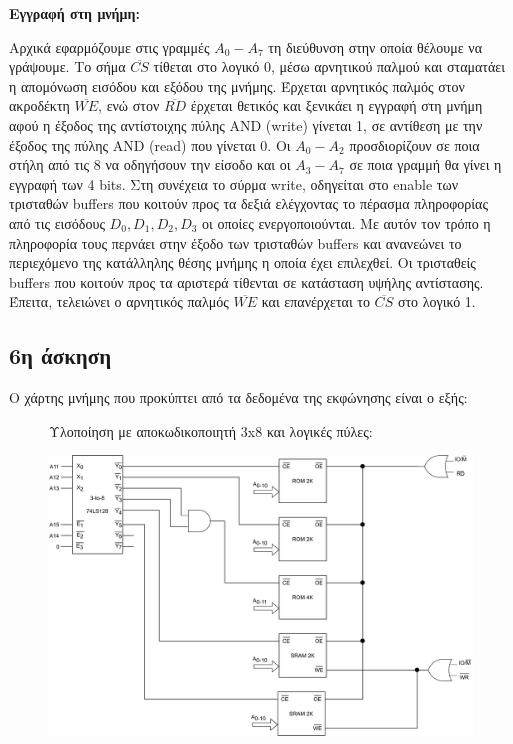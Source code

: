 \documentclass[a4paper]{article}
\begin{document}
\textbf{Εγγραφή στη μνήμη:}

Αρχικά εφαρμόζουμε στις γραμμές $Α_0-Α_7$ τη διεύθυνση στην οποία θέλουμε να γράψουμε. Το σήμα $\overline{CS}$ τίθεται στο λογικό 0, μέσω αρνητικού παλμού και σταματάει η απομόνωση εισόδου και εξόδου της μνήμης. Έρχεται αρνητικός παλμός στον ακροδέκτη $\overline{WE}$, ενώ στον $\overline{RD}$ έρχεται θετικός και ξενικάει η εγγραφή στη μνήμη αφού η έξοδος της αντίστοιχης πύλης AND (write) γίνεται 1, σε αντίθεση με την έξοδος της πύλης AND (read) που γίνεται 0. Οι $Α_0-A_2$ προσδιορίζουν σε ποια στήλη από τις 8 να οδηγήσουν την είσοδο και οι $Α_3-Α_7$ σε ποια γραμμή θα γίνει η εγγραφή των 4 bits. Στη συνέχεια το σύρμα write, οδηγείται στο enable των τρισταθών buffers που κοιτούν προς τα δεξιά ελέγχοντας το πέρασμα πληροφορίας από τις εισόδους $D_0, D_1, D_2, D_3$ οι οποίες ενεργοποιούνται. Με αυτόν τον τρόπο η πληροφορία τους περνάει στην έξοδο των τρισταθών buffers και ανανεώνει το περιεχόμενο της κατάλληλης θέσης μνήμης η οποία έχει επιλεχθεί. Οι τρισταθείς buffers που κοιτούν προς τα αριστερά τίθενται σε κατάσταση υψήλης αντίστασης. Έπειτα, τελειώνει ο αρνητικός παλμός $\overline{WE}$ και επανέρχεται το $\overline{CS}$ στο λογικό 1.


\subsection*{6η άσκηση}

Ο χάρτης μνήμης που προκύπτει από τα δεδομένα της εκφώνησης είναι ο εξής: \\



\begin{landscape}
\begin{figure}[H]
Υλοποίηση με αποκωδικοποιητή 3x8 και λογικές πύλες:
\begin{center}
\includegraphics[width=1.3\textwidth]{ex6a.pdf}
\end{center}
\end{figure}
\end{landscape}
\end{document}
